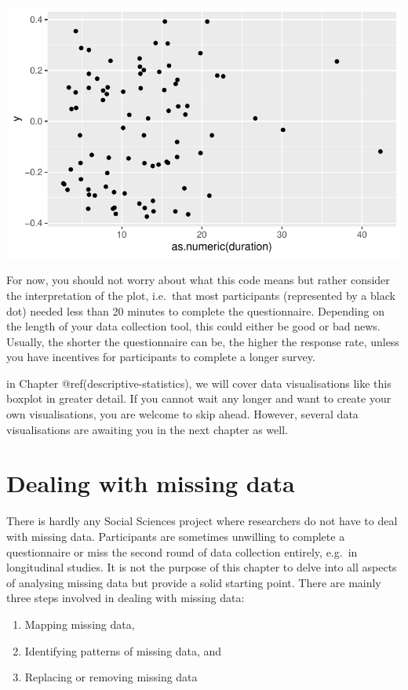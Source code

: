 \documentclass[
  letterpaper,
]{krantz}
\begin{document}
\includegraphics{07_data_wrangling_files/figure-pdf/duration-boxplot-1.pdf}

For now, you should not worry about what this code means but rather
consider the interpretation of the plot, i.e.~that most participants
(represented by a black dot) needed less than 20 minutes to complete the
questionnaire. Depending on the length of your data collection tool,
this could either be good or bad news. Usually, the shorter the
questionnaire can be, the higher the response rate, unless you have
incentives for participants to complete a longer survey.

in Chapter @ref(descriptive-statistics), we will cover data
visualisations like this boxplot in greater detail. If you cannot wait
any longer and want to create your own visualisations, you are welcome
to skip ahead. However, several data visualisations are awaiting you in
the next chapter as well.

\section{Dealing with missing data}\label{dealing-with-missing-data}

There is hardly any Social Sciences project where researchers do not
have to deal with missing data. Participants are sometimes unwilling to
complete a questionnaire or miss the second round of data collection
entirely, e.g.~in longitudinal studies. It is not the purpose of this
chapter to delve into all aspects of analysing missing data but provide
a solid starting point. There are mainly three steps involved in dealing
with missing data:

\begin{enumerate}
\def\labelenumi{\arabic{enumi}.}
\item
  Mapping missing data,
\item
  Identifying patterns of missing data, and
\item
  Replacing or removing missing data
\end{enumerate}
\end{document}
